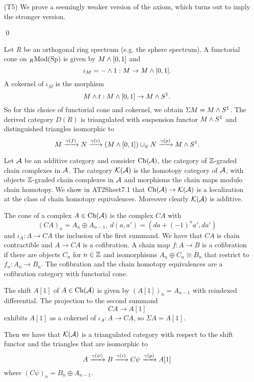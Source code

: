 

(T5) We prove a seemingly weaker version of the axiom, which turns out to imply the stronger version.

\medskip
{}
\smallskip

\qed

\begin{example}
Let $R$ be an orthogonal ring spectrum (e.g. the sphere spectrum). A functorial cone on ${}_{R\!}\operatorname{Mod}({\normalfont\textup{Sp}})$ is given by $M\wedge[0,1]$ and
\[\iota_M=-\wedge1:M\to M\wedge[0,1].\]
A cokernel of $\iota_M$ is the morphism
\[M\wedge t:M\wedge[0,1]\to M\wedge S^1.\]
So for this choice of functorial cone and cokernel, we obtain $\Sigma M=M\wedge S^1$. The derived category $D(R)$ is triangulated with suspension functor $M\wedge S^1$ and distinguished triangles isomorphic to
\[M\xrightarrow{\gamma(f)}N\xrightarrow{\gamma(i)}(M\wedge[0,1])\cup_\psi N\xrightarrow{\gamma(p)}M\wedge S^1.\]
\end{example}

\begin{example}
Let $\mathcal{A}$ be an additive category and consider $\operatorname{Ch}(\mathcal{A})$, the category of ${\mathbb Z}$-graded chain complexes in $\mathcal{A}$. The category $\mathcal{K}(\mathcal{A})$ is the homotopy category of $\mathcal{A}$, with objects ${\mathbb Z}$-graded chain complexes in $\mathcal{A}$ and morphisms the chain maps modulo chain homotopy. We show in AT2Sheet7.1 that $\operatorname{Ch}(\mathcal{A})\to\mathcal{K}(\mathcal{A})$ is a localization at the class of chain homotopy equivalences. Moreover clearly $\mathcal{K}(\mathcal{A})$ is additive.

The cone of a complex $A\in\operatorname{Ch}(\mathcal{A})$ is the complex $CA$ with
\[(CA)_n=A_n\oplus A_{n-1},\ d(a,a')=(da+(-1)^na',da')\]
and $\iota_A:A\to CA$ the inclusion of the first summand. We have that $CA$ is chain contractible and $A\to CA$ is a cofibration. A chain map $f:A\to B$ is a cofibration if there are objects $C_n$ for $n\in{\mathbb Z}$ and isomorphisms $A_n\oplus C_n\cong B_n$ that restrict to $f_n:A_n\to B_n$. The cofibration and the chain homotopy equivalences are a cofibration category with functorial cone.

The shift $A[1]$ of $A\in\operatorname{Ch}(\mathcal{A})$ is given by $(A[1])_n=A_{n-1}$ with reindexed differential. The projection to the second summand
\[CA\to A[1]\]
exhibits $A[1]$ as a cokernel of $\iota_A:A\to CA$, so $\Sigma A=A[1]$.

Then we have that $\mathcal{K}(\mathcal{A})$ is a triangulated category with respect to the shift functor and the triangles that are isomorphic to 
\[A\xrightarrow{\gamma(\psi)}B\xrightarrow{\gamma(i)}C\psi\xrightarrow{\gamma(p)}A[1]\]
where $(C\psi)_n=B_n\oplus A_{n-1}$.
\end{example}

